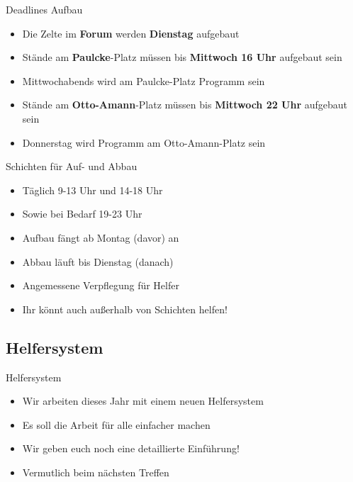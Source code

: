 \begin{frame}[c]{Deadlines Aufbau}
    \begin{itemize}[<+(1)->]
        \item Die Zelte im \textbf{Forum} werden \textbf{Dienstag} aufgebaut
        \item Stände am \textbf{Paulcke}-Platz müssen bis \textbf{Mittwoch 16 Uhr} aufgebaut sein
        \item Mittwochabends wird am Paulcke-Platz Programm sein
        \item Stände am \textbf{Otto-Amann}-Platz müssen bis \textbf{Mittwoch 22 Uhr} aufgebaut sein
        \item Donnerstag wird Programm am Otto-Amann-Platz sein
    \end{itemize}
\end{frame}


\begin{frame}[c]{Schichten für Auf- und Abbau}
    \begin{itemize}[<+(1)->]
        \item Täglich 9-13 Uhr und 14-18 Uhr
        \item<handout> Sowie bei Bedarf 19-23 Uhr
        \item Aufbau fängt ab Montag (davor) an
        \item Abbau läuft bis Dienstag (danach)
        \item Angemessene Verpflegung für Helfer
        \item<handout> Ihr könnt auch außerhalb von Schichten helfen!
    \end{itemize}
\end{frame}



\subsection{Helfersystem}

\begin{frame}[c]{Helfersystem}
    \begin{itemize}[<+(1)->]
        \item Wir arbeiten dieses Jahr mit einem neuen Helfersystem
        \item Es soll die Arbeit für alle einfacher machen
        \item Wir geben euch noch eine detaillierte Einführung!
        \item<handout> Vermutlich beim nächsten Treffen
    \end{itemize}
\end{frame}


